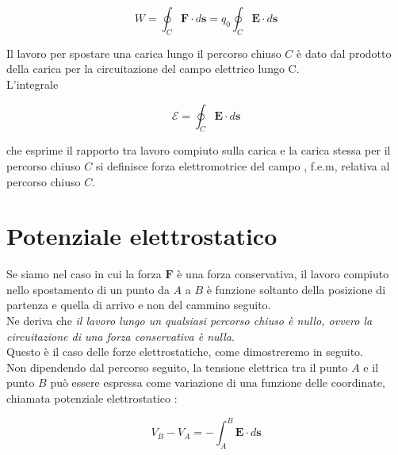 \begin{equation}
    W = \oint_C \mathbf{F} \cdot d \mathbf{s} = q_0 \oint_C \mathbf{E} \cdot d \mathbf{s}
\end{equation}

Il lavoro per spostare una carica lungo il percorso chiuso $C$ è dato dal prodotto della carica per la circuitazione del campo elettrico lungo C. \\
L'integrale 

\begin{tcolorbox}[colback=yellow!10!white, colframe=orange!70!black, boxrule=0.8pt]
\begin{equation}
    \mathcal{E} = \oint_C \mathbf{E} \cdot d \mathbf{s}
\end{equation}
\end{tcolorbox}

che esprime il rapporto tra lavoro compiuto sulla carica e la carica stessa per il percorso chiuso $C$ si definisce forza elettromotrice del campo , f.e.m, relativa al percorso chiuso $C$.

\section{Potenziale elettrostatico}

Se siamo nel caso in cui la forza $\mathbf{F}$ è una forza conservativa, il lavoro compiuto nello spostamento di un punto da $A$ a $B$ è funzione soltanto della posizione di partenza e quella di arrivo e non del cammino seguito. \\
Ne deriva che \emph{il lavoro lungo un qualsiasi percorso chiuso è nullo, ovvero la circuitazione di una forza conservativa è nulla}. \\

Questo è il caso delle forze elettrostatiche, come dimostreremo in seguito. \\
Non dipendendo dal percorso seguito, la tensione elettrica tra il punto $A$ e il punto $B$ può essere espressa come variazione di una funzione  delle coordinate, chiamata potenziale elettrostatico :

\begin{tcolorbox}[colback=yellow!10!white, colframe=orange!70!black, boxrule=0.8pt]
\begin{equation}
    V_B - V_A = - \int_A ^B \mathbf{E} \cdot d \mathbf{s}
    \label{eq:definizione_differenza_di_potenziale}
\end{equation}
\end{tcolorbox}

